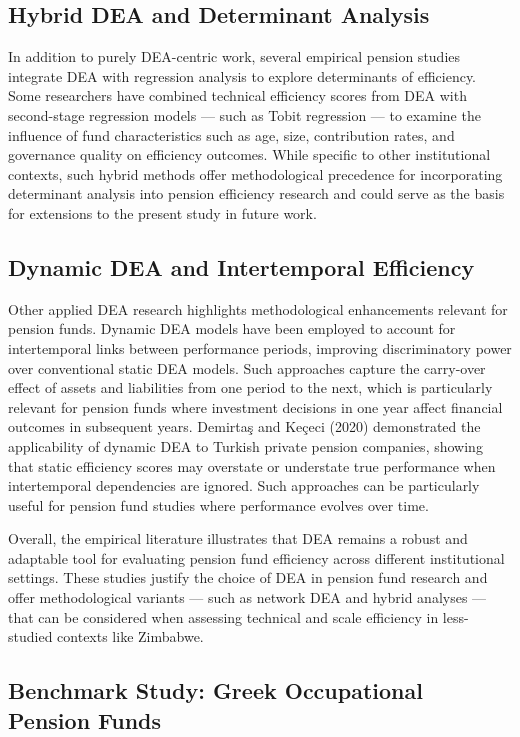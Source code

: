 \documentclass[12pt,a4paper]{article}
\begin{document}
\subsection{Hybrid DEA and Determinant Analysis}

In addition to purely DEA-centric work, several empirical pension studies integrate DEA with regression analysis to explore determinants of efficiency. Some researchers have combined technical efficiency scores from DEA with second-stage regression models --- such as Tobit regression --- to examine the influence of fund characteristics such as age, size, contribution rates, and governance quality on efficiency outcomes. While specific to other institutional contexts, such hybrid methods offer methodological precedence for incorporating determinant analysis into pension efficiency research and could serve as the basis for extensions to the present study in future work.

\subsection{Dynamic DEA and Intertemporal Efficiency}

Other applied DEA research highlights methodological enhancements relevant for pension funds. Dynamic DEA models have been employed to account for intertemporal links between performance periods, improving discriminatory power over conventional static DEA models. Such approaches capture the carry-over effect of assets and liabilities from one period to the next, which is particularly relevant for pension funds where investment decisions in one year affect financial outcomes in subsequent years. Demirta\c{s} and Ke\c{c}eci (2020) demonstrated the applicability of dynamic DEA to Turkish private pension companies, showing that static efficiency scores may overstate or understate true performance when intertemporal dependencies are ignored. Such approaches can be particularly useful for pension fund studies where performance evolves over time.

Overall, the empirical literature illustrates that DEA remains a robust and adaptable tool for evaluating pension fund efficiency across different institutional settings. These studies justify the choice of DEA in pension fund research and offer methodological variants --- such as network DEA and hybrid analyses --- that can be considered when assessing technical and scale efficiency in less-studied contexts like Zimbabwe.

\subsection{Benchmark Study: Greek Occupational Pension Funds}
\end{document}
